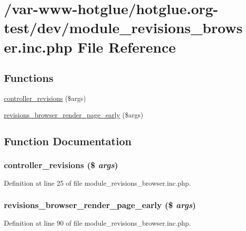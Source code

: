 \hypertarget{module__revisions__browser_8inc_8php}{
\section{/var-\/www-\/hotglue/hotglue.org-\/test/dev/module\_\-revisions\_\-browser.inc.php File Reference}
\label{module__revisions__browser_8inc_8php}
}
\subsection*{Functions}
\begin{DoxyCompactItemize}
\item 
\hyperlink{module__revisions__browser_8inc_8php_a9eda010871ad706aca87cfd7b9dd0f7d}{controller\_\-revisions} (\$args)
\item 
\hyperlink{module__revisions__browser_8inc_8php_aeb482f35141c71dd933daeec9e9ce599}{revisions\_\-browser\_\-render\_\-page\_\-early} (\$args)
\end{DoxyCompactItemize}


\subsection{Function Documentation}
\hypertarget{module__revisions__browser_8inc_8php_a9eda010871ad706aca87cfd7b9dd0f7d}{
\subsubsection[{controller\_\-revisions}]{\setlength{\rightskip}{0pt plus 5cm}controller\_\-revisions (\$ {\em args})}}
\label{module__revisions__browser_8inc_8php_a9eda010871ad706aca87cfd7b9dd0f7d}


Definition at line 25 of file module\_\-revisions\_\-browser.inc.php.

\hypertarget{module__revisions__browser_8inc_8php_aeb482f35141c71dd933daeec9e9ce599}{
\subsubsection[{revisions\_\-browser\_\-render\_\-page\_\-early}]{\setlength{\rightskip}{0pt plus 5cm}revisions\_\-browser\_\-render\_\-page\_\-early (\$ {\em args})}}
\label{module__revisions__browser_8inc_8php_aeb482f35141c71dd933daeec9e9ce599}


Definition at line 90 of file module\_\-revisions\_\-browser.inc.php.

